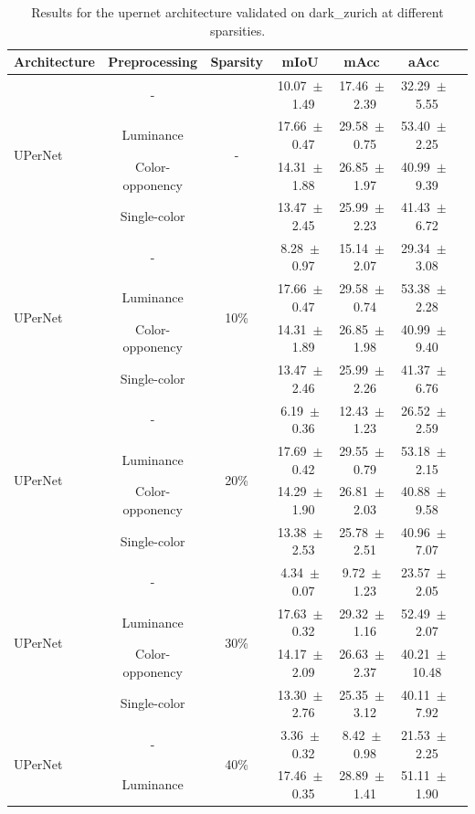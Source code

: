 \begin{table}[h]
\centering
\caption{Results for the upernet architecture validated on dark_zurich at different sparsities.}
\begin{tabular}{@{}lccc ccc@{}}
\toprule
Architecture & Preprocessing & Sparsity & mIoU & mAcc & aAcc \\
\midrule

\multirow{4}{*}{UPerNet} & - & \multirow{4}{*}{-} & 10.07~$\pm$~1.49 & 17.46~$\pm$~2.39 & 32.29~$\pm$~5.55 \\
& Luminance & & 17.66~$\pm$~0.47 & 29.58~$\pm$~0.75 & 53.40~$\pm$~2.25 \\
& Color-opponency & & 14.31~$\pm$~1.88 & 26.85~$\pm$~1.97 & 40.99~$\pm$~9.39 \\
& Single-color & & 13.47~$\pm$~2.45 & 25.99~$\pm$~2.23 & 41.43~$\pm$~6.72 \\
\midrule
\multirow{4}{*}{UPerNet} & - & \multirow{4}{*}{10\%} & 8.28~$\pm$~0.97 & 15.14~$\pm$~2.07 & 29.34~$\pm$~3.08 \\
& Luminance & & 17.66~$\pm$~0.47 & 29.58~$\pm$~0.74 & 53.38~$\pm$~2.28 \\
& Color-opponency & & 14.31~$\pm$~1.89 & 26.85~$\pm$~1.98 & 40.99~$\pm$~9.40 \\
& Single-color & & 13.47~$\pm$~2.46 & 25.99~$\pm$~2.26 & 41.37~$\pm$~6.76 \\
\midrule
\multirow{4}{*}{UPerNet} & - & \multirow{4}{*}{20\%} & 6.19~$\pm$~0.36 & 12.43~$\pm$~1.23 & 26.52~$\pm$~2.59 \\
& Luminance & & 17.69~$\pm$~0.42 & 29.55~$\pm$~0.79 & 53.18~$\pm$~2.15 \\
& Color-opponency & & 14.29~$\pm$~1.90 & 26.81~$\pm$~2.03 & 40.88~$\pm$~9.58 \\
& Single-color & & 13.38~$\pm$~2.53 & 25.78~$\pm$~2.51 & 40.96~$\pm$~7.07 \\
\midrule
\multirow{4}{*}{UPerNet} & - & \multirow{4}{*}{30\%} & 4.34~$\pm$~0.07 & 9.72~$\pm$~1.23 & 23.57~$\pm$~2.05 \\
& Luminance & & 17.63~$\pm$~0.32 & 29.32~$\pm$~1.16 & 52.49~$\pm$~2.07 \\
& Color-opponency & & 14.17~$\pm$~2.09 & 26.63~$\pm$~2.37 & 40.21~$\pm$~10.48 \\
& Single-color & & 13.30~$\pm$~2.76 & 25.35~$\pm$~3.12 & 40.11~$\pm$~7.92 \\
\midrule
\multirow{4}{*}{UPerNet} & - & \multirow{4}{*}{40\%} & 3.36~$\pm$~0.32 & 8.42~$\pm$~0.98 & 21.53~$\pm$~2.25 \\
& Luminance & & 17.46~$\pm$~0.35 & 28.89~$\pm$~1.41 & 51.11~$\pm$~1.90 \\

\end{tabular}
\end{table}

